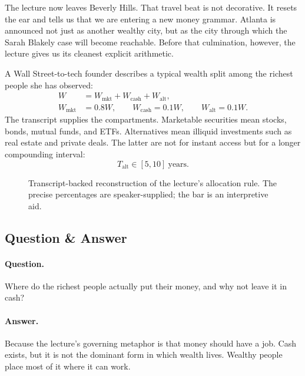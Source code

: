 The lecture now leaves Beverly Hills. That travel beat is not decorative. It resets the ear and tells us that we are entering a new money grammar. Atlanta is announced not just as another wealthy city, but as the city through which the Sarah Blakely case will become reachable. Before that culmination, however, the lecture gives us its cleanest explicit arithmetic.

A Wall Street-to-tech founder describes a typical wealth split among the richest people she has observed:
\begin{align}
W &= W_{\mathrm{mkt}} + W_{\mathrm{cash}} + W_{\mathrm{alt}}, \\
W_{\mathrm{mkt}} &= 0.8W, \qquad
W_{\mathrm{cash}} = 0.1W, \qquad
W_{\mathrm{alt}} = 0.1W.
\end{align}
The transcript supplies the compartments. Marketable securities mean stocks, bonds, mutual funds, and ETFs. Alternatives mean illiquid investments such as real estate and private deals. The latter are not for instant access but for a longer compounding interval:
\begin{equation}
T_{\mathrm{alt}} \in [5,10]\ \text{years}.
\end{equation}

\begin{figure}[h]
\centering
{}
\caption{Transcript-backed reconstruction of the lecture's allocation rule. The precise percentages are speaker-supplied; the bar is an interpretive aid.}
\end{figure}

\subsection{Question \& Answer}

\paragraph{Question.} Where do the richest people actually put their money, and why not leave it in cash?

\paragraph{Answer.} Because the lecture's governing metaphor is that money should have a job. Cash exists, but it is not the dominant form in which wealth lives. Wealthy people place most of it where it can work.


